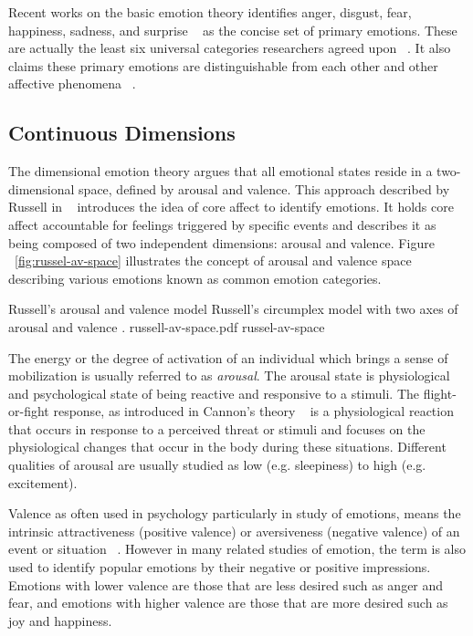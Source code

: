 \documentclass{uofsthesis-cs}
\begin{document}
Recent works on the basic emotion theory identifies anger, disgust, fear, happiness, sadness, and surprise ~\cite{peter2006emotion} as the concise set of primary emotions. These are actually the least six universal categories researchers agreed upon ~\cite{zagalo2004story}. It also claims these primary emotions are distinguishable from each other and other affective phenomena ~\cite{dalgleish1999handbook}.

\subsection{Continuous Dimensions}

The dimensional emotion theory argues that all emotional states reside in a two-dimensional space, defined by arousal and valence. This approach described by Russell in ~\cite{russell2003core} introduces the idea of core affect to identify emotions. It holds core affect accountable for feelings triggered by specific events and describes it as being composed of two independent dimensions: arousal and valence. Figure ~\ref{fig:russel-av-space} illustrates the concept of arousal and valence space describing various emotions known as common emotion categories.

\img
{Russell's arousal and valence model}
{Russell's circumplex model with two axes of arousal and valence \footnotemark.}
{russell-av-space.pdf}
{russel-av-space}

The energy or the degree of activation of an individual which brings a sense of mobilization is usually referred to as \textit{arousal}. The arousal state is physiological and psychological state of being reactive and responsive to a stimuli. The flight-or-fight response, as introduced in Cannon's theory ~\cite{stern2001psychophysiological} is a physiological reaction that occurs in response to a perceived threat or stimuli and focuses on the physiological changes that occur in the body during these situations. Different qualities of arousal are usually studied as low (e.g. sleepiness) to high (e.g. excitement).

Valence as often used in psychology particularly in study of emotions, means the intrinsic attractiveness (positive valence) or aversiveness (negative valence) of an event or situation ~\cite{frijda1986emotions}. However in many related studies of emotion, the term is also used to identify popular emotions by their negative or positive impressions. Emotions with lower valence are those that are less desired such as anger and fear, and emotions with higher valence are those that are more desired such as joy and happiness.
\end{document}
